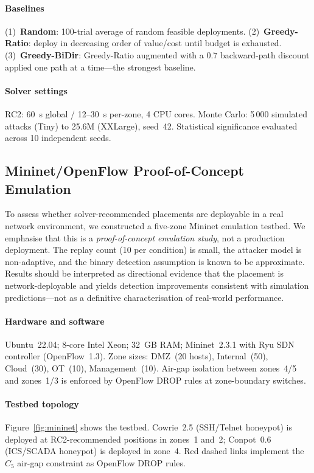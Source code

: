 \documentclass[journal]{IEEEtran}
\begin{document}
\paragraph{Baselines}
(1)~\textbf{Random}: 100-trial average of random feasible deployments.
(2)~\textbf{Greedy-Ratio}: deploy in decreasing order of value/cost
until budget is exhausted.
(3)~\textbf{Greedy-BiDir}: Greedy-Ratio augmented with a $0.7$
backward-path discount applied one path at a time---the strongest
baseline.

\paragraph{Solver settings}
RC2: 60~s global / 12--30~s per-zone, 4 CPU cores. Monte Carlo:
5\,000 simulated attacks (Tiny) to 25.6M (XXLarge), seed~42.
Statistical significance evaluated across 10 independent seeds.

\subsection{Mininet/OpenFlow Proof-of-Concept Emulation}
\label{sec:emulation}

To assess whether solver-recommended placements are deployable in a
real network environment, we constructed a five-zone Mininet emulation
testbed. We emphasise that this is a \emph{proof-of-concept emulation
study}, not a production deployment. The replay count (10 per
condition) is small, the attacker model is non-adaptive, and the
binary detection assumption is known to be approximate. Results
should be interpreted as directional evidence that the placement is
network-deployable and yields detection improvements consistent with
simulation predictions---not as a definitive characterisation of
real-world performance.

\paragraph{Hardware and software}
Ubuntu~22.04; 8-core Intel Xeon; 32~GB RAM; Mininet~2.3.1 with Ryu
SDN controller (OpenFlow~1.3). Zone sizes: DMZ~(20 hosts),
Internal~(50), Cloud~(30), OT~(10), Management~(10). Air-gap
isolation between zones~4/5 and zones~1/3 is enforced by OpenFlow
DROP rules at zone-boundary switches.

\paragraph{Testbed topology}
Figure~\ref{fig:mininet} shows the testbed. Cowrie~2.5 (SSH/Telnet
honeypot) is deployed at RC2-recommended positions in zones~1 and~2;
Conpot~0.6 (ICS/SCADA honeypot) is deployed in zone~4. Red dashed
links implement the $C_5$ air-gap constraint as OpenFlow DROP rules.
\end{document}
